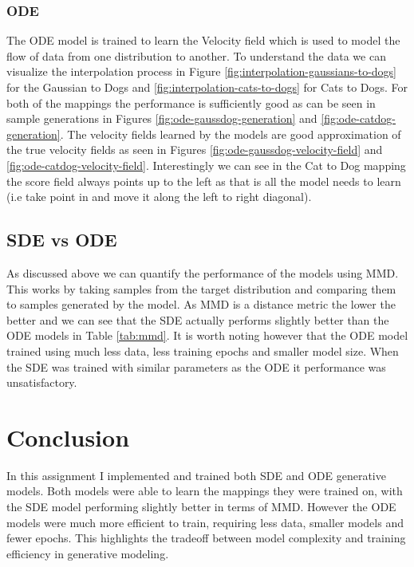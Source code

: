 \documentclass[conference,a4paper]{IEEEtran}
\begin{document}
\subsubsection{ODE}

The ODE model is trained to learn the Velocity field which is used to model the flow of data from one distribution to another. To understand the data we can visualize the interpolation process in Figure \ref{fig:interpolation-gaussians-to-dogs} for the Gaussian to Dogs  and \ref{fig:interpolation-cats-to-dogs} for Cats to Dogs. For both of the mappings the performance is sufficiently good as can be seen in sample generations in Figures \ref{fig:ode-gaussdog-generation} and \ref{fig:ode-catdog-generation}. The velocity fields learned by the models are good approximation of the true velocity fields as seen in Figures \ref{fig:ode-gaussdog-velocity-field} and \ref{fig:ode-catdog-velocity-field}. Interestingly we can see in the Cat to Dog mapping the score field always points up to the left as that is all the model needs to learn (i.e take point in and move it along the left to right diagonal).

\subsection{SDE vs ODE}

As discussed above we can quantify the performance of the models using MMD. This works by taking samples from the target distribution and comparing them to samples generated by the model. As MMD is a distance metric the lower the better and we can see that the SDE actually performs slightly better than the ODE models in Table \ref{tab:mmd}. It is worth noting however that the ODE model trained using much less data, less training epochs and smaller model size. When the SDE was trained with similar parameters as the ODE it performance was unsatisfactory.
\section{Conclusion}

In this assignment I implemented and trained both SDE and ODE generative models. Both models were able to learn the mappings they were trained on, with the SDE model performing slightly better in terms of MMD. However the ODE models were much more efficient to train, requiring less data, smaller models and fewer epochs. This highlights the tradeoff between model complexity and training efficiency in generative modeling.
\end{document}
